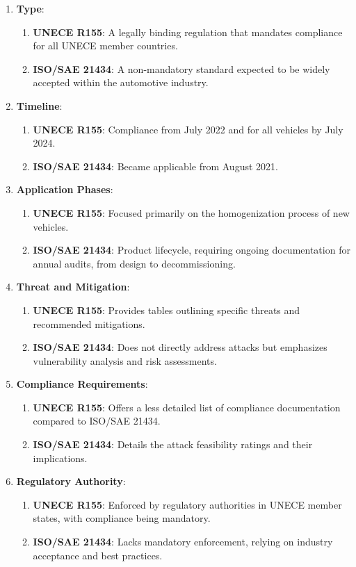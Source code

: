 \begin{enumerate}
    \item \textbf{Type}:
    \begin{enumerate}
        \item \textbf{UNECE R155}: A legally binding regulation that mandates compliance for all UNECE member countries.
        \item \textbf{ISO/SAE 21434}: A non-mandatory standard expected to be widely accepted within the automotive industry.
    \end{enumerate}

    \item \textbf{Timeline}:
    \begin{enumerate}
        \item \textbf{UNECE R155}: Compliance from July 2022 and for all vehicles by July 2024.
        \item \textbf{ISO/SAE 21434}: Became applicable from August 2021.
    \end{enumerate}

    \item \textbf{Application Phases}:
    \begin{enumerate}
        \item \textbf{UNECE R155}: Focused primarily on the homogenization process of new vehicles.
        \item \textbf{ISO/SAE 21434}: Product lifecycle, requiring ongoing documentation for annual audits, from design to decommissioning.
    \end{enumerate}

    \item \textbf{Threat and Mitigation}:
    \begin{enumerate}
        \item \textbf{UNECE R155}: Provides tables outlining specific threats and recommended mitigations.
        \item \textbf{ISO/SAE 21434}: Does not directly address attacks but emphasizes vulnerability analysis and risk assessments.
    \end{enumerate}

    \item \textbf{Compliance Requirements}:
    \begin{enumerate}
        \item \textbf{UNECE R155}: Offers a less detailed list of compliance documentation compared to ISO/SAE 21434.
        \item \textbf{ISO/SAE 21434}: Details the attack feasibility ratings and their implications.
    \end{enumerate}

    \item \textbf{Regulatory Authority}:
    \begin{enumerate}
        \item \textbf{UNECE R155}: Enforced by regulatory authorities in UNECE member states, with compliance being mandatory.
        \item \textbf{ISO/SAE 21434}: Lacks mandatory enforcement, relying on industry acceptance and best practices.
    \end{enumerate}
\end{enumerate}

